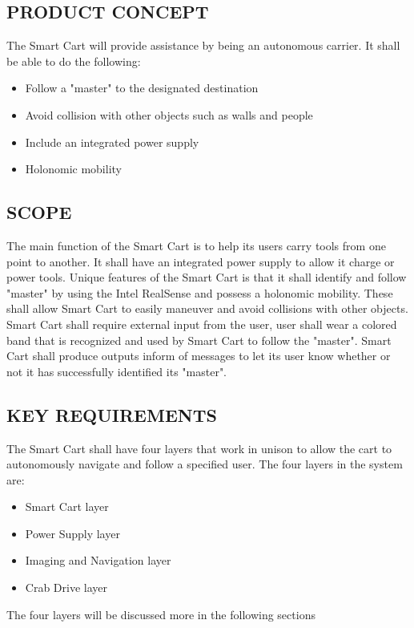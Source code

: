 \subsection{PRODUCT CONCEPT}
The Smart Cart will provide assistance by being an autonomous carrier. It shall be able to do the following:
\begin{itemize}
\item Follow a "master" to the designated destination
\item Avoid collision with other objects such as walls and people
\item Include an integrated power supply
\item Holonomic mobility
\end{itemize}
\subsection{SCOPE}
The main function of the Smart Cart is to help its users carry tools from one point to another. It shall have an integrated power supply to allow it charge or power tools. Unique features of the Smart Cart is that it shall identify and follow "master" by using the Intel RealSense and possess a holonomic mobility. These shall allow Smart Cart to easily maneuver and avoid collisions with other objects. Smart Cart shall require external input from the user, user shall wear a colored band that is recognized and used by Smart Cart to follow the "master". Smart Cart shall produce outputs inform of messages to let its user know whether or not it has successfully identified its "master".
\subsection{KEY REQUIREMENTS}
The Smart Cart shall have four layers that work in unison to allow the cart to autonomously navigate and follow a specified user. The four layers in the system are: 
\begin{itemize}
\item Smart Cart layer
\item Power Supply layer
\item Imaging and Navigation layer
\item  Crab Drive layer
\end{itemize}
The four layers will be discussed more in the following sections
